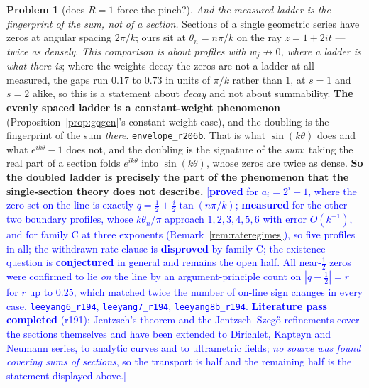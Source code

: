 \documentclass[11pt,a4paper]{article}
\theoremstyle{plain}
\theoremstyle{definition}
\newtheorem{problem}[theorem]{Problem}
\theoremstyle{remark}
\newcommand{\STATUS}[1]{\textcolor{blue}{\textsf{[#1]}}}
\begin{document}
\begin{problem}[does $R=1$ force the pinch?]
\emph{And the measured ladder is the fingerprint of the sum, not of a section.} Sections of a
single geometric series have zeros at angular spacing $2\pi/k$; ours sit at
$\theta_n=n\pi/k$ on the ray $z=1+2it$ --- \emph{twice as densely}. \emph{This comparison is
about profiles with $w_j\not\to0$, where a ladder is what there is}; where the weights decay the
zeros are not a ladder at all --- measured, the gaps run $0.17$ to $0.73$ in units of $\pi/k$
rather than $1$, at $s=1$ and $s=2$ alike, so this is a statement about \emph{decay} and not
about summability. \textbf{The evenly spaced ladder is a constant-weight phenomenon}
(Proposition~\ref{prop:gqgen}'s constant-weight case), and the doubling is the fingerprint of the
sum \emph{there}. \texttt{envelope\_r206b}. That is what
$\sin(k\theta)$ does and what $e^{ik\theta}-1$ does not, and the doubling is the signature of the
\emph{sum}: taking the real part of a section folds $e^{ik\theta}$ into $\sin(k\theta)$, whose
zeros are twice as dense. \textbf{So the doubled ladder is precisely the part of the phenomenon
that the single-section theory does not describe.}
\STATUS{\textbf{proved} for $a_i=2^{i}-1$, where the zero set on the line is exactly
$q=\tfrac12+\tfrac{i}{2}\tan(n\pi/k)$; \textbf{measured} for the other two boundary profiles,
whose $k\theta_n/\pi$ approach $1,2,3,4,5,6$ with error $O(k^{-1})$, and for family C at three
exponents (Remark~\ref{rem:rateregimes}), so five profiles in all; the withdrawn rate clause is
\textbf{disproved} by family C; the existence question is \textbf{conjectured} in general and
remains the open half. All near-$\tfrac12$ zeros were confirmed to lie \emph{on} the line by an argument-principle
count on $|q-\tfrac12|=r$ for $r$ up to $0.25$, which matched twice the number of on-line sign
changes in every case.
\texttt{leeyang6\_r194}, \texttt{leeyang7\_r194}, \texttt{leeyang8b\_r194}. \textbf{Literature pass completed} (r191):
Jentzsch's theorem and the Jentzsch--Szeg\H{o} refinements cover the sections themselves and have
been extended to Dirichlet, Kapteyn and Neumann series, to analytic curves and to ultrametric
fields; \emph{no source was found covering sums of sections}, so the transport is half and the
remaining half is the statement displayed above.}
\end{problem}
\end{document}
